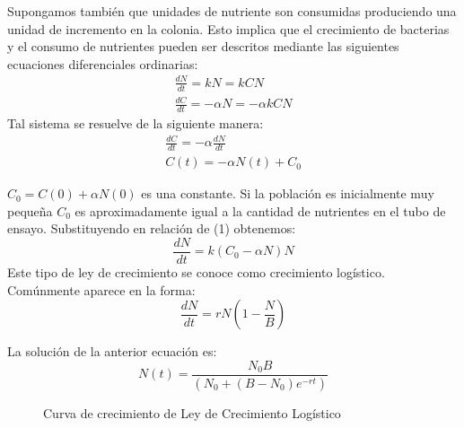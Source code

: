 Supongamos también que unidades de nutriente son consumidas produciendo una unidad de incremento en la colonia. Esto implica que el crecimiento de bacterias y el consumo de nutrientes pueden ser descritos mediante las siguientes ecuaciones diferenciales ordinarias:
\begin{equation}
    \begin{split} %
        \frac{dN}{dt} = kN = kCN\\
        \frac{dC}{dt} = -\alpha N = -\alpha k CN
    \end{split}
\end{equation}
Tal sistema se resuelve de la siguiente manera:
\begin{equation}
    \begin{split}
        \frac{dC}{dt} = -\alpha \frac{dN}{dt}\\
        C(t) = -\alpha N(t) + C_{0}
    \end{split}
\end{equation}
 

$C_{0} = C(0) + \alpha N(0)$ es una constante. Si la población es inicialmente muy pequeña $C_{0}$ es aproximadamente igual a la cantidad de nutrientes en el tubo de ensayo. Substituyendo en relaci\'on de (1) obtenemos:
\begin{equation}
    \frac{dN}{dt} = k(C_{0} - \alpha N)N
\end{equation}
Este tipo de ley de crecimiento se conoce como crecimiento logístico. Comúnmente aparece en la forma:
\begin{equation}
    \frac{dN}{dt} = rN(1 - \frac{N}{B})
\end{equation}

La soluci\'on de la anterior ecuaci\'on es:
\begin{equation}
    N(t) = \frac{N_{0}B}{(N_{0} + (B - N_{0})e^{-rt})}
\end{equation}
\begin{figure}[!ht]
\begin{center}
\end{center}\vspace*{-0.6cm}
\caption[Curva de crecimiento de Ley de Crecimiento Log\'istico]{Curva de crecimiento de Ley de Crecimiento Log\'istico}
\label{fig-logistico}
\end{figure}


